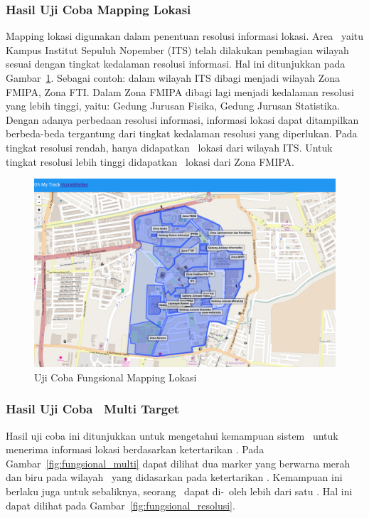 \subsubsection{Hasil Uji Coba Mapping Lokasi}

Mapping lokasi digunakan dalam penentuan resolusi informasi lokasi. Area
\tracking~yaitu Kampus Institut Sepuluh Nopember (ITS) telah dilakukan pembagian
wilayah sesuai dengan tingkat kedalaman resolusi informasi. Hal ini ditunjukkan
pada Gambar~\ref{fig:fungsional_area}. Sebagai contoh: dalam wilayah ITS dibagi
menjadi wilayah Zona FMIPA, Zona FTI. Dalam Zona FMIPA dibagi lagi menjadi
kedalaman resolusi yang lebih tinggi, yaitu: Gedung Jurusan Fisika, Gedung
Jurusan Statistika. Dengan adanya perbedaan resolusi informasi, informasi lokasi
dapat ditampilkan berbeda-beda tergantung dari tingkat kedalaman resolusi yang
diperlukan. Pada tingkat resolusi rendah, hanya didapatkan \centroid~lokasi dari
wilayah ITS. Untuk tingkat resolusi lebih tinggi didapatkan \centroid~lokasi
dari Zona FMIPA.

\noindent
\begin{figure}
  \centering
  \includegraphics[scale=0.25]
	{images/4-fungsional-area.png}
  \caption{Uji Coba Fungsional Mapping Lokasi}
\label{fig:fungsional_area}
\end{figure}


\subsubsection{Hasil Uji Coba \Tracking~Multi Target}

Hasil uji coba ini ditunjukkan untuk mengetahui kemampuan sistem \tracking~untuk
menerima informasi lokasi berdasarkan ketertarikan \subscriber. Pada
Gambar~\ref{fig:fungsional_multi} dapat dilihat dua marker yang berwarna merah
dan biru pada wilayah \tracking~yang didasarkan pada ketertarikan \subscriber.
Kemampuan ini berlaku juga untuk sebaliknya, seorang \publisher~dapat
di-\track~oleh lebih dari satu \subscriber. Hal ini dapat dilihat pada
Gambar~\ref{fig:fungsional_resolusi}.

